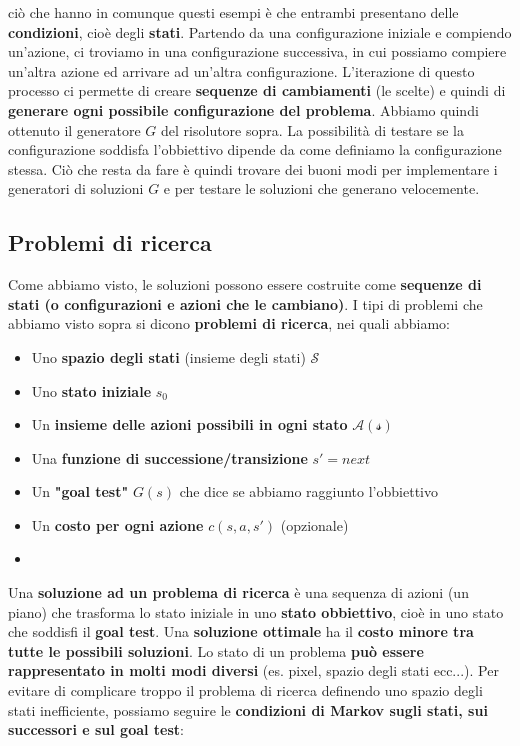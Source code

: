 \documentclass[12pt]{article}
\begin{document}
ciò che hanno in comunque questi esempi è che entrambi presentano delle \textbf{condizioni}, cioè degli \textbf{stati}.
Partendo da una configurazione iniziale e compiendo un'azione, ci troviamo in una configurazione successiva, in cui possiamo compiere
un'altra azione ed arrivare ad un'altra configurazione. L'iterazione di questo processo ci permette di creare \textbf{sequenze di cambiamenti} (le scelte) e quindi di \textbf{generare ogni possibile configurazione del problema}.
Abbiamo quindi ottenuto il generatore $G$ del risolutore sopra.
La possibilità di testare se la configurazione soddisfa l'obbiettivo dipende da come definiamo la configurazione stessa.
Ciò che resta da fare è quindi trovare dei buoni modi per implementare i generatori di soluzioni $G$ e per testare le soluzioni che generano velocemente.
\subsection{Problemi di ricerca}
Come abbiamo visto, le soluzioni possono essere costruite come \textbf{sequenze di stati (o configurazioni e azioni che le cambiano)}.
I tipi di problemi che abbiamo visto sopra si dicono \textbf{problemi di ricerca}, nei quali abbiamo:
\begin{itemize}
    \item Uno \textbf{spazio degli stati} (insieme degli stati) $\mathcal{S}$
    \item Uno \textbf{stato iniziale} $s_0$
    \item Un \textbf{insieme delle azioni possibili in ogni stato} $\mathcal{A}(\mathcal{s})$
    \item Una \textbf{funzione di successione/transizione} $s' = next$
    \item Un \textbf{"goal test"} $G(s)$ che dice se abbiamo raggiunto l'obbiettivo
    \item Un \textbf{costo per ogni azione} $c(s, a, s')$ (opzionale)
    \item 
\end{itemize}
Una \textbf{soluzione ad un problema di ricerca} è una sequenza di azioni (un piano) che trasforma lo stato iniziale in uno \textbf{stato obbiettivo}, cioè in uno stato che soddisfi il \textbf{goal test}.
Una \textbf{soluzione ottimale} ha il \textbf{costo minore tra tutte le possibili soluzioni}.
Lo stato di un problema \textbf{può essere rappresentato in molti modi diversi} (es. pixel, spazio degli stati ecc...).
Per evitare di complicare troppo il problema di ricerca definendo uno spazio degli stati inefficiente, possiamo seguire le \textbf{condizioni di Markov sugli stati, sui successori e sul goal test}:
\end{document}
